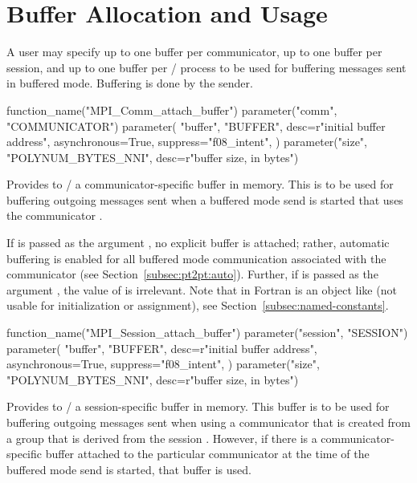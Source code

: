 \section{Buffer Allocation and Usage}
\label{sec:pt2pt-buffer}

A user may specify up to one buffer per communicator, up to one buffer per session, and up to one buffer per \MPI/ process to be used for buffering messages sent in buffered mode.  Buffering is done by the sender.

\begin{mpi-binding}
    function_name("MPI_Comm_attach_buffer")
    parameter("comm", "COMMUNICATOR")
    parameter(
        "buffer",
        "BUFFER",
        desc=r"initial buffer address",
        asynchronous=True,
        suppress="f08_intent",
    )
    parameter("size", "POLYNUM_BYTES_NNI", desc=r"buffer size, in bytes")
\end{mpi-binding}

Provides to \MPI/ a communicator-specific buffer in memory. This is to be used for buffering outgoing
messages sent when a buffered mode send is started that uses the communicator .

If  is passed as the argument , no explicit buffer is attached; rather, automatic buffering is enabled for all buffered mode communication associated with the communicator  (see Section~\ref{subsec:pt2pt:auto}).
Further, if  is passed as the argument , the value of  is irrelevant.
Note that in Fortran  is an
object like  (not usable for initialization or
assignment), see Section~\ref{subsec:named-constants}.



\begin{mpi-binding}
    function_name("MPI_Session_attach_buffer")
    parameter("session", "SESSION")
    parameter(
        "buffer",
        "BUFFER",
        desc=r"initial buffer address",
        asynchronous=True,
        suppress="f08_intent",
    )
    parameter("size", "POLYNUM_BYTES_NNI", desc=r"buffer size, in bytes")
\end{mpi-binding}

Provides to \MPI/ a session-specific buffer in memory. This buffer is to be used for buffering outgoing
messages sent when using a communicator that is created from a group that is derived from the session . However, if there is a communicator-specific buffer attached to the particular communicator at the time of the buffered mode send is started, that buffer is used.

